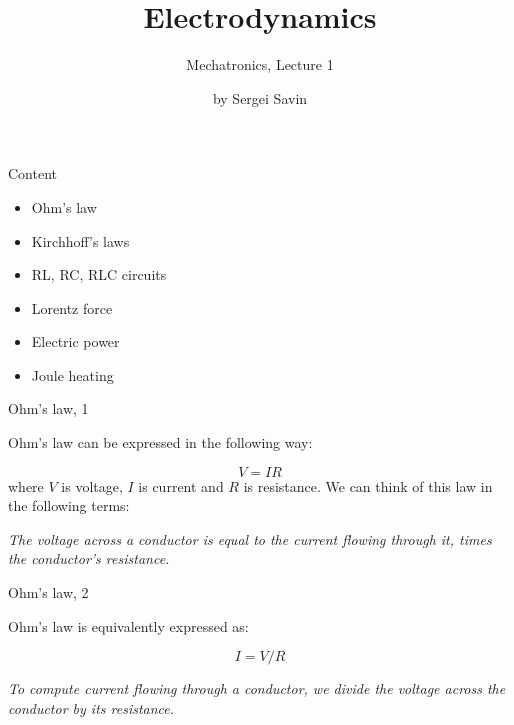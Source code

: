 \documentclass{beamer}
\title{Electrodynamics}
\subtitle{Mechatronics, Lecture 1}
\author{by Sergei Savin}
\date{\mydate}
\begin{document}
\maketitle



\begin{frame}{Content}
\begin{itemize}
\item Ohm's law
\item Kirchhoff's laws
\item RL, RC, RLC circuits
\item Lorentz force
\item Electric power
\item Joule heating
\end{itemize}
\end{frame}



\begin{frame}{Ohm's law, 1}
\begin{flushleft}

Ohm's law can be expressed in the following way:

\begin{equation}
	V = IR
\end{equation}
%
where $V$ is voltage, $I$ is current and $R$ is resistance. We can think of this law in the following terms:

\bigskip

\emph{The voltage across a conductor is equal to the current flowing through it, times the conductor's resistance.}



\end{flushleft}
\end{frame}





\begin{frame}{Ohm's law, 2}
	\begin{flushleft}
		
		Ohm's law is equivalently expressed as:
		
		\begin{equation}
			I = V / R
		\end{equation}
		
		\bigskip
		
		\emph{To compute current flowing through a conductor, we divide the voltage across the conductor by its resistance.}
		
	\end{flushleft}
\end{frame}
\end{document}
